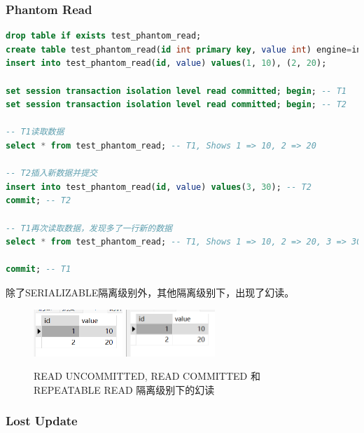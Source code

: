 \documentclass{article}
\begin{document}
\subsubsection{Phantom Read}

\begin{lstlisting}[language=sql]
drop table if exists test_phantom_read;
create table test_phantom_read(id int primary key, value int) engine=innodb;
insert into test_phantom_read(id, value) values(1, 10), (2, 20);

set session transaction isolation level read committed; begin; -- T1
set session transaction isolation level read committed; begin; -- T2

-- T1读取数据
select * from test_phantom_read; -- T1, Shows 1 => 10, 2 => 20

-- T2插入新数据并提交
insert into test_phantom_read(id, value) values(3, 30); -- T2
commit; -- T2

-- T1再次读取数据，发现多了一行新的数据
select * from test_phantom_read; -- T1, Shows 1 => 10, 2 => 20, 3 => 30

commit; -- T1
\end{lstlisting}

除了SERIALIZABLE隔离级别外，其他隔离级别下，出现了幻读。

\begin{figure}[H]
\centering
\includegraphics[width=0.3\textwidth]{img/56.png}
\includegraphics[width=0.3\textwidth]{img/57.png}
\caption{READ UNCOMMITTED, READ COMMITTED 和 REPEATABLE READ 隔离级别下的幻读}
\end{figure}

\subsubsection{Lost Update}
\end{document}
